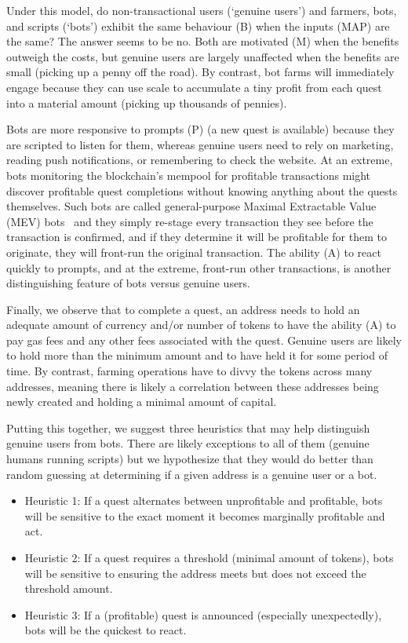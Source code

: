 Under this model, do non-transactional users (`genuine users') and farmers, bots, and scripts (`bots') exhibit the same behaviour (B) when the inputs (MAP) are the same? The answer seems to be no. Both are motivated (M) when the benefits outweigh the costs, but genuine users are largely unaffected when the benefits are small (\cf picking up a penny off the road). By contrast, bot farms will immediately engage because they can use scale to accumulate a tiny profit from each quest into a material amount (\cf picking up thousands of pennies).

Bots are more responsive to prompts (P) (\eg a new quest is available) because they are scripted to listen for them, whereas genuine users need to rely on marketing, reading push notifications, or remembering to check the website. At an extreme, bots monitoring the blockchain's mempool for profitable transactions might discover profitable quest completions without knowing anything about the quests themselves. Such bots are called general-purpose Maximal Extractable Value (MEV) bots~\cite{DGK+20} and they simply re-stage every transaction they see before the transaction is confirmed, and if they determine it will be profitable for them to originate, they will front-run the original transaction. The ability (A) to react quickly to prompts, and at the extreme, front-run other transactions, is another distinguishing feature of bots versus genuine users. 

Finally, we observe that to complete a quest, an address needs to hold an adequate amount of currency and/or number of tokens to have the ability (A) to pay gas fees and any other fees associated with the quest. Genuine users are likely to hold more than the minimum amount and to have held it for some period of time. By contrast, farming operations have to divvy the tokens across many addresses, meaning there is likely a correlation between these addresses being newly created and holding a minimal amount of capital.

Putting this together, we suggest three heuristics that may help distinguish genuine users from bots. There are likely exceptions to all of them (\eg genuine humans running scripts) but we hypothesize that they would do better than random guessing at determining if a given address is a genuine user or a bot.

\begin{itemize}
\item Heuristic 1: If a quest alternates between unprofitable and profitable, bots will be sensitive to the exact moment it becomes marginally profitable and act.
\item Heuristic 2: If a quest requires a threshold (minimal amount of tokens), bots will be sensitive to ensuring the address meets but does not exceed the threshold amount. 
\item Heuristic 3: If a (profitable) quest is announced (especially unexpectedly), bots will be the quickest to react.
\end{itemize}

